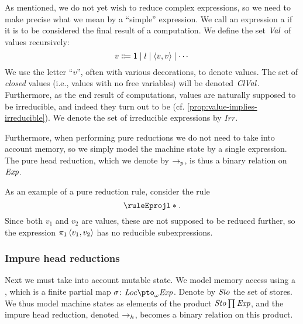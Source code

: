 \newcommand{\setIrr}{\mathit{Irr}}

As mentioned, we do not yet wish to reduce complex expressions, so we need to make precise what we mean by a \enquote{simple} expression. We call an expression a  if it is to be considered the final result of a computation. We define the set $\mathit{Val}$ of values recursively:
%
\begin{equation*}
    v \Coloneqq \mathsf{1} \mid l \mid \langle\textcolor{black}{v},\textcolor{black}{v}\rangle \mid \cdots
\end{equation*}
%
We use the letter \enquote{$v$}, often with various decorations, to denote values. The set of \emph{closed} values (i.e., values with no free variables) will be denoted $\mathit{ClVal}$. Furthermore, as the end result of computations, values are naturally supposed to be irreducible, and indeed they turn out to be (cf. \cref{prop:value-implies-irreducible}). We denote the set of irreducible expressions by $\setIrr$.\index[notation]{Irr@$\setIrr$}

Furthermore, when performing pure reductions we do not need to take into account memory, so we simply model the machine state by a single expression. The pure head reduction, which we denote by $\to_p$, is thus a binary relation on $\mathit{Exp}$.

As an example of a pure reduction rule, consider the rule
%
\begin{equation*}
    \ruleEprojl*.
\end{equation*}
%
Since both $v_1$ and $v_2$ are values, these are not supposed to be reduced further, so the expression $\expProjl{\expPair{v_1}{v_2}}$ has no reducible subexpressions.


\subsubsection{Impure head reductions}\label{sec:impure-head-reduction}

Next we must take into account mutable state. We model memory access using a , which is a finite partial map $\sigma \colon \setLoc \ptofin \setExp$. Denote by $\mathit{Sto}$ the set of stores. We thus model machine states as elements of the product $\mathit{Sto} \prod \mathit{Exp}$, and the impure head reduction, denoted $\to_h$, becomes a binary relation on this product.

